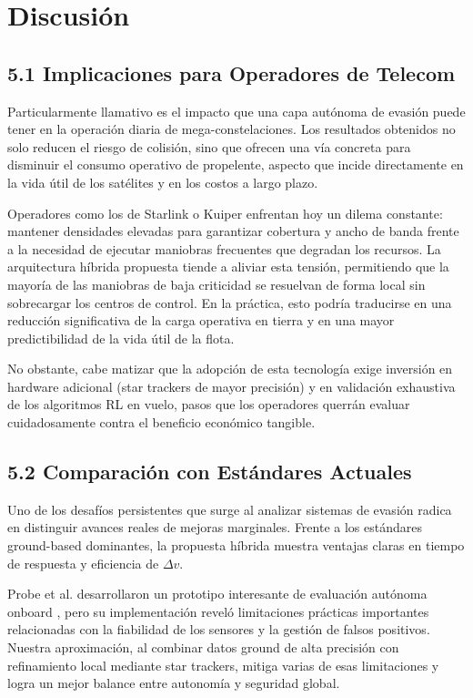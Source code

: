 \section{Discusión}

\subsection{5.1 Implicaciones para Operadores de Telecom}

Particularmente llamativo es el impacto que una capa autónoma de evasión puede tener en la operación diaria de mega-constelaciones. Los resultados obtenidos no solo reducen el riesgo de colisión, sino que ofrecen una vía concreta para disminuir el consumo operativo de propelente, aspecto que incide directamente en la vida útil de los satélites y en los costos a largo plazo.

Operadores como los de Starlink o Kuiper enfrentan hoy un dilema constante: mantener densidades elevadas para garantizar cobertura y ancho de banda frente a la necesidad de ejecutar maniobras frecuentes que degradan los recursos. La arquitectura híbrida propuesta tiende a aliviar esta tensión, permitiendo que la mayoría de las maniobras de baja criticidad se resuelvan de forma local sin sobrecargar los centros de control. En la práctica, esto podría traducirse en una reducción significativa de la carga operativa en tierra y en una mayor predictibilidad de la vida útil de la flota.

No obstante, cabe matizar que la adopción de esta tecnología exige inversión en hardware adicional (star trackers de mayor precisión) y en validación exhaustiva de los algoritmos RL en vuelo, pasos que los operadores querrán evaluar cuidadosamente contra el beneficio económico tangible.

\subsection{5.2 Comparación con Estándares Actuales}

Uno de los desafíos persistentes que surge al analizar sistemas de evasión radica en distinguir avances reales de mejoras marginales. Frente a los estándares ground-based dominantes, la propuesta híbrida muestra ventajas claras en tiempo de respuesta y eficiencia de \(\Delta v\).

Probe et al. desarrollaron un prototipo interesante de evaluación autónoma onboard \cite{probe2022autonomous}, pero su implementación reveló limitaciones prácticas importantes relacionadas con la fiabilidad de los sensores y la gestión de falsos positivos. Nuestra aproximación, al combinar datos ground de alta precisión con refinamiento local mediante star trackers, mitiga varias de esas limitaciones y logra un mejor balance entre autonomía y seguridad global. 

